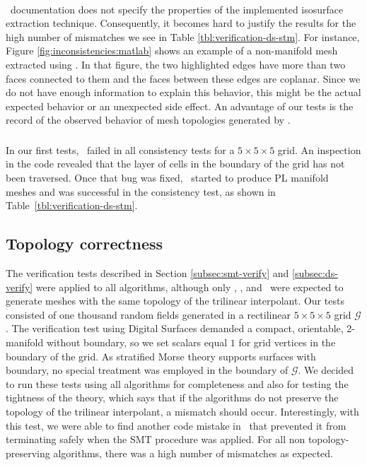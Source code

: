 \paragraph*{\matlab}

\matlab\ documentation does not specify the properties of the
implemented isosurface extraction technique. Consequently, it becomes
hard to justify the results for the high number of mismatches we see
in Table \ref{tbl:verification-ds-stm}.  For instance, Figure
\ref{fig:inconsistencies:matlab} shows an example of a non-manifold
mesh extracted using \matlab. In that figure, the two highlighted
edges have more than two faces connected to them and the faces between
these edges are coplanar.  Since we do not have enough information to
explain this behavior, this might be the actual expected behavior or
an unexpected side effect. An advantage of our tests is the record of
the observed behavior of mesh topologies generated by \matlab.

\subsubsection{\macet}

In our first tests, \macet\ failed in all consistency tests for a $5 \times 5 \times 5$ grid. 
An inspection in the code revealed that the layer of cells in the boundary of the grid
has not been traversed. Once that bug was fixed, \macet\ started to produce
PL manifold
meshes and was successful in the consistency test, as shown in Table~\ref{tbl:verification-ds-stm}.

\subsection{Topology correctness}
\label{sec:correctness}


The verification tests described in Section \ref{subsec:smt-verify}
and \ref{subsec:ds-verify} were applied to all algorithms, although
only \mclewiner, \deliso, and \mcsimpleflow\ were expected to generate
meshes with the same topology of the trilinear interpolant. Our tests
consisted of one thousand random fields generated in a rectilinear $5
\times 5 \times 5$ grid $\mathcal{G}$.  The verification test using
Digital Surfaces demanded a compact, orientable, 2-manifold without
boundary, so we set scalars equal $1$ for grid vertices in the
boundary of the grid.  As stratified Morse theory supports surfaces
with boundary, no special treatment was employed in the boundary of
$\mathcal{G}$. We decided to run these tests using all algorithms for
completeness and also for testing the tightness of the theory, which
says that if the algorithms do not preserve the topology of the
trilinear interpolant, a mismatch should occur.  Interestingly, with
this test, we were able to find another code mistake in \macet\ that
prevented it from terminating safely when the SMT procedure was applied. 
For all non topology-preserving algorithms, there was a high
number of mismatches as expected.

